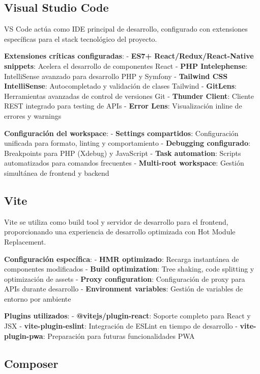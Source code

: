 \documentclass[12pt,a4paper,oneside]{report}
\begin{document}
\subsection{Visual Studio Code}\label{visual-studio-code}

VS Code actúa como IDE principal de desarrollo, configurado con
extensiones específicas para el stack tecnológico del proyecto.

\textbf{Extensiones críticas configuradas}: - \textbf{ES7+
React/Redux/React-Native snippets}: Acelera el desarrollo de componentes
React - \textbf{PHP Intelephense}: IntelliSense avanzado para desarrollo
PHP y Symfony - \textbf{Tailwind CSS IntelliSense}: Autocompletado y
validación de clases Tailwind - \textbf{GitLens}: Herramientas avanzadas
de control de versiones Git - \textbf{Thunder Client}: Cliente REST
integrado para testing de APIs - \textbf{Error Lens}: Visualización
inline de errores y warnings

\textbf{Configuración del workspace}: - \textbf{Settings compartidos}:
Configuración unificada para formato, linting y comportamiento -
\textbf{Debugging configurado}: Breakpoints para PHP (Xdebug) y
JavaScript - \textbf{Task automation}: Scripts automatizados para
comandos frecuentes - \textbf{Multi-root workspace}: Gestión simultánea
de frontend y backend

\subsection{Vite}\label{vite}

Vite se utiliza como build tool y servidor de desarrollo para el
frontend, proporcionando una experiencia de desarrollo optimizada con
Hot Module Replacement.

\textbf{Configuración específica}: - \textbf{HMR optimizado}: Recarga
instantánea de componentes modificados - \textbf{Build optimization}:
Tree shaking, code splitting y optimización de assets - \textbf{Proxy
configuration}: Configuración de proxy para APIs durante desarrollo -
\textbf{Environment variables}: Gestión de variables de entorno por
ambiente

\textbf{Plugins utilizados}: - \textbf{@vitejs/plugin-react}: Soporte
completo para React y JSX - \textbf{vite-plugin-eslint}: Integración de
ESLint en tiempo de desarrollo - \textbf{vite-plugin-pwa}: Preparación
para futuras funcionalidades PWA

\subsection{Composer}\label{composer}
\end{document}
